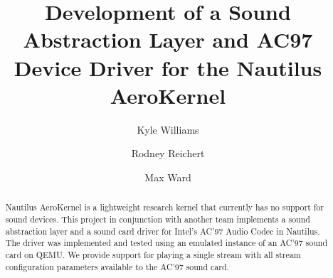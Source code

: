 \documentclass[sigplan,screen]{acmart}
\begin{document}
\title{Development of a Sound Abstraction Layer and AC97 Device Driver for the Nautilus AeroKernel}

\author{Kyle Williams}

\author{Rodney Reichert}
\author{Max Ward}



\renewcommand{\shortauthors}{TEMP}

\begin{abstract}
Nautilus AeroKernel is a lightweight research kernel that currently has no
support for sound devices. This project in conjunction with another team implements a sound abstraction layer and a sound card driver for Intel's AC'97 Audio Codec in Nautilus. The driver was implemented and tested using an emulated instance of an AC'97 sound card on QEMU. We provide support for playing a single stream with all stream configuration parameters available to the AC'97 sound card.
\end{abstract}
\end{document}
